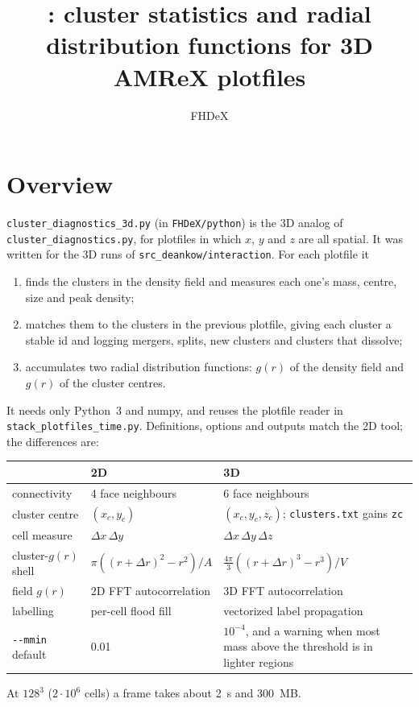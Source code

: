 \documentclass[11pt]{article}
\title{\code{cluster\_diagnostics\_3d.py}: cluster statistics and radial\\
distribution functions for 3D AMReX plotfiles}
\author{FHDeX}
\date{}
\newcommand{\code}[1]{\texttt{#1}}
\begin{document}
\maketitle

\section{Overview}

\code{cluster\_diagnostics\_3d.py} (in \code{FHDeX/python}) is the 3D analog of
\code{cluster\_diagnostics.py}, for plotfiles in which $x$, $y$ and $z$ are all
spatial. It was written for the 3D runs of \code{src\_deankow/interaction}. For each
plotfile it
\begin{enumerate}[nosep]
  \item finds the clusters in the density field and measures each one's mass,
        centre, size and peak density;
  \item matches them to the clusters in the previous plotfile, giving each
        cluster a stable id and logging mergers, splits, new clusters and
        clusters that dissolve;
  \item accumulates two radial distribution functions: $g(r)$ of the density
        field and $g(r)$ of the cluster centres.
\end{enumerate}
It needs only Python~3 and numpy, and reuses the plotfile reader in
\code{stack\_plotfiles\_time.py}. Definitions, options and outputs match the 2D
tool; the differences are:
\begin{center}
\begin{tabularx}{\textwidth}{@{}l L L@{}}
\toprule
 & 2D & 3D \\
\midrule
connectivity & 4 face neighbours & 6 face neighbours \\
cluster centre & $(x_c,y_c)$ & $(x_c,y_c,z_c)$; \code{clusters.txt} gains \code{zc} \\
cell measure & $\Delta x\,\Delta y$ & $\Delta x\,\Delta y\,\Delta z$ \\
cluster-$g(r)$ shell & $\pi((r+\Delta r)^2-r^2)/A$ & $\tfrac{4\pi}{3}((r+\Delta r)^3-r^3)/V$ \\
field $g(r)$ & 2D FFT autocorrelation & 3D FFT autocorrelation \\
labelling & per-cell flood fill & vectorized label propagation \\
\code{-{}-mmin} default & 0.01 & $10^{-4}$, and a warning when most mass above the threshold is in lighter regions \\
\bottomrule
\end{tabularx}
\end{center}
At $128^3$ ($2\cdot10^6$ cells) a frame takes about 2~s and 300~MB.
\end{document}
